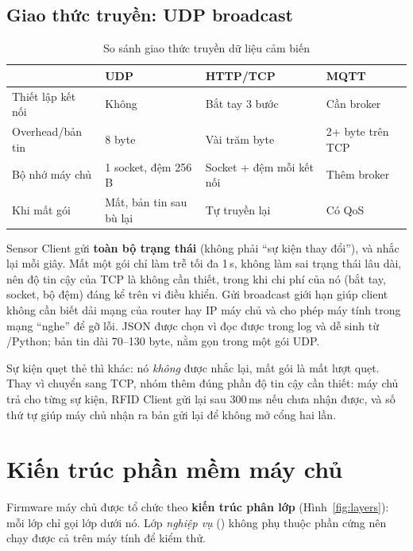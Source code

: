 \subsection{Giao thức truyền: UDP broadcast}
\begin{table}[H]
\centering\small
\caption{So sánh giao thức truyền dữ liệu cảm biến}\label{tab:proto}
\begin{tabularx}{\linewidth}{@{}lXXX@{}}
\toprule
& \textbf{UDP} & \textbf{HTTP/TCP} & \textbf{MQTT} \\ \midrule
Thiết lập kết nối & Không & Bắt tay 3 bước & Cần broker \\
Overhead/bản tin & 8 byte & Vài trăm byte & 2+ byte trên TCP \\
Bộ nhớ máy chủ & 1 socket, đệm 256\,B & Socket + đệm mỗi kết nối & Thêm broker \\
Khi mất gói & Mất, bản tin sau bù lại & Tự truyền lại & Có QoS \\
\bottomrule
\end{tabularx}
\end{table}

\begin{lydo}
Sensor Client gửi \textbf{toàn bộ trạng thái} (không phải ``sự kiện thay đổi''), và
nhắc lại mỗi giây. Mất một gói chỉ làm trễ tối đa 1\,s, không làm sai trạng thái lâu
dài, nên độ tin cậy của TCP là không cần thiết, trong khi chi phí của nó (bắt tay,
socket, bộ đệm) đáng kể trên vi điều khiển. Gửi broadcast giới hạn
 giúp client không cần biết dải mạng của router hay IP máy chủ
và cho phép máy tính trong mạng ``nghe'' để gỡ lỗi. JSON được chọn vì đọc
được trong log và dễ sinh từ /Python; bản tin dài 70–130 byte, nằm
gọn trong một gói UDP.

Sự kiện quẹt thẻ thì khác: nó \emph{không} được nhắc lại, mất gói là mất lượt quẹt.
Thay vì chuyển sang TCP, nhóm thêm đúng phần độ tin cậy cần thiết: máy chủ trả
 cho từng sự kiện, RFID Client gửi lại sau 300\,ms nếu chưa nhận được, và
số thứ tự giúp máy chủ nhận ra bản gửi lại để không mở cổng hai lần.
\end{lydo}

\section{Kiến trúc phần mềm máy chủ}\label{sec:phanlop}
Firmware máy chủ được tổ chức theo \textbf{kiến trúc phân lớp} (Hình~\ref{fig:layers}):
mỗi lớp chỉ gọi lớp dưới nó. Lớp \emph{nghiệp vụ} () không phụ thuộc
phần cứng nên chạy được cả trên máy tính để kiểm thử.

